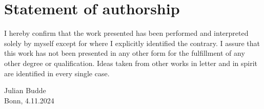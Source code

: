 \documentclass[12pt,a4paper,english]{article} %
\numberwithin{equation}{section}
\theoremstyle{definition}
\theoremstyle{remark}
\theoremstyle{plain}
\begin{document}
\clearpage
\newpage

\section*{Statement of authorship}

I hereby confirm that the work presented has been performed and interpreted solely by myself except for where I explicitly identified the contrary.
I assure that this work has not been presented in any other form for the fulfillment of any other degree or qualification.
Ideas taken from other works in letter and in spirit are identified in every single case.\\[3cm]

\begingroup
    \setlength{\parindent}{0pt}
    \begin{singlespace}
        Julian Budde\\
        Bonn, 4.11.2024
    \end{singlespace}
\endgroup
\end{document}
